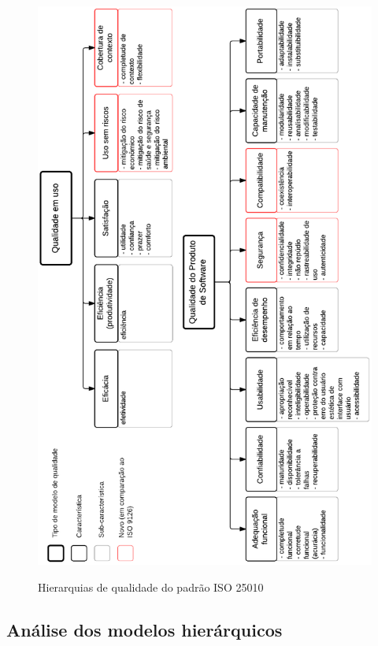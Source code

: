 \documentclass[
	12pt,				%
	openright,			%
	oneside,			%
	a4paper,			%
	english,			%
	brazil,				%
	]{abntex2}
\begin{document}
\begin{figure}[H]
    \centering
    \caption{Hierarquias de qualidade do padrão ISO 25010}
    \graphicspath{ {./graphics/} }
    \includegraphics[scale=0.9]{iso25010-hierarquia_qualidade_completa-andrei-rev2}
    \label{fig:iso25010-hierarquia_qualidade_completa}
\end{figure}

\subsection{Análise dos modelos hierárquicos}
\end{document}
